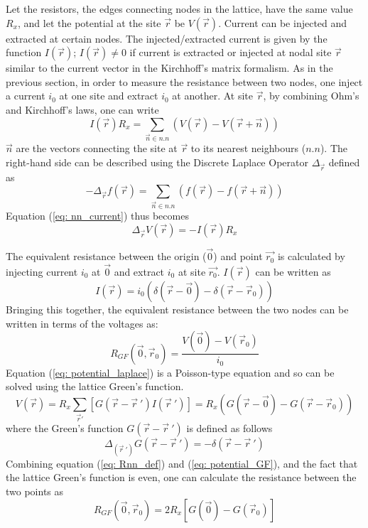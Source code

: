 Let the resistors, the edges connecting nodes in the lattice, have the same value $R_x$, and let the potential at the site $\vec{r}$ be $V(\vec{r})$. Current can be injected and extracted at certain nodes. The injected/extracted current is given by the function $I(\vec{r})$; $I(\vec{r})\neq0$ if current is extracted or injected at nodal site $\vec{r}$ similar to the current vector in the Kirchhoff's matrix formalism. As in the previous section, in order to measure the resistance between two nodes, one inject a current $i_0$ at one site and extract $i_0$ at another. At site $\vec{r}$, by combining Ohm's and Kirchhoff's laws, one can write 
\begin{equation}
I(\vec{r}) R_x = \sum_{\vec{n} \in n.n}\left(V(\vec{r}) - V(\vec{r} + \vec{n})\right)
\label{eq: nn_current}
\end{equation}
$\vec{n}$ are the vectors connecting the site at $\vec{r}$ to its nearest neighbours ($n.n$). The right-hand side can be described using the Discrete Laplace Operator $\Delta_{\vec{r}}$ defined as
\begin{equation}
-\Delta_{\vec{r}} f(\vec{r}) = \sum_{\vec{n} \in n.n}\left(f(\vec{r}) - f(\vec{r} + \vec{n})\right)
\end{equation}
Equation (\ref{eq: nn_current}) thus becomes 
\begin{equation}
\Delta_{\vec{r}} V(\vec{r}) = -I(\vec{r})R_x
\label{eq: potential_laplace}
\end{equation}

The equivalent resistance between the origin ($\vec{0}$) and point $\vec{r_0}$ is calculated by injecting current $i_0$ at $\vec{0}$ and extract $i_0$ at site $\vec{r_0}$. $I(\vec{r})$ can be written as 
\begin{equation}
I(\vec{r}) = i_0(\delta(\vec{r}-\vec{0}) - \delta(\vec{r}-\vec{r}_0))
\end{equation}
Bringing this together, the equivalent resistance between the two nodes can be written in terms of the voltages as:
\begin{equation}
R_{GF}(\vec{0},\vec{r}_0)=\frac{V(\vec{0}) -V(\vec{r}_0) }{i_0}
\label{eq: Rnn_def}
\end{equation}
Equation (\ref{eq: potential_laplace}) is a Poisson-type equation and so can be solved using the lattice Green's function.
\begin{equation}
V(\vec{r}) = R_x \sum_{\vec{r}'}[G(\vec{r} - \vec{r}~')I(\vec{r}~')] = R_x( G(\vec{r}-\vec{0})-G(\vec{r}-\vec{r}_0))
\label{eq: potential_GF}
\end{equation}
where the Green's function $G(\vec{r} - \vec{r}~')$ is defined as follows
\begin{equation}
\Delta_{(\vec{r}~')}G(\vec{r}-\vec{r}~') = -\delta(\vec{r}-\vec{r}~')
\label{eq: greens_def}
\end{equation}
Combining equation (\ref{eq: Rnn_def}) and (\ref{eq: potential_GF}), and the fact that the lattice Green's function is even, one can calculate the resistance between the two points as
\begin{equation}
R_{GF}(\vec{0},\vec{r}_0) = 2R_x[G(\vec{0})-G(\vec{r}_0)]
\label{eq: res_from_gf}
\end{equation}

